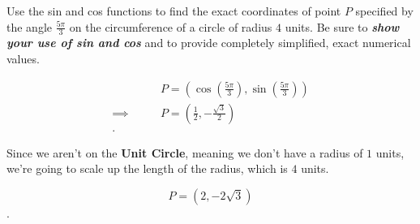 \begin{problem}
  Use the sin and cos functions to find the exact coordinates of point $P$ 
  specified by the angle $\frac{5\pi}{3}$ on the circumference of a circle of
  radius $4$ units. Be sure to \textbf{\textit{show your use of sin and cos}}
  and to provide completely simplified, exact numerical values.

  \begin{figure}[H]
    \centering
    \label{fig:4_units}


    \caption{}
  \end{figure}
\end{problem}

\begin{solution}
  \begin{align*}
    &\qquad P = \left(\cos \left(\frac{5\pi}{3}\right), \sin \left(\frac{5\pi}{3}\right)\right) \\
    \implies&\qquad P = \left(\frac{1}{2}, -\frac{\sqrt{3}}{2}\right) \\
  .\end{align*}

  Since we aren't on the \textbf{Unit Circle}, meaning we don't have a radius of
  $1$ units, we're going to scale up the length of the radius, which is $4$ 
  units.

  \[ P = \left(2, -2\sqrt{3}\right) \].
\end{solution}

\newpage

